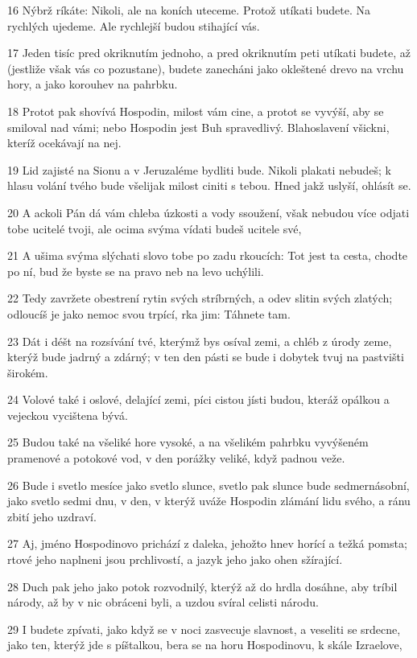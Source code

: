\par 16 Nýbrž ríkáte: Nikoli, ale na koních uteceme. Protož utíkati budete. Na rychlých ujedeme. Ale rychlejší budou stihající vás.
\par 17 Jeden tisíc pred okriknutím jednoho, a pred okriknutím peti utíkati budete, až (jestliže však vás co pozustane), budete zanecháni jako okleštené drevo na vrchu hory, a jako korouhev na pahrbku.
\par 18 Protot pak shovívá Hospodin, milost vám cine, a protot se vyvýší, aby se smiloval nad vámi; nebo Hospodin jest Buh spravedlivý. Blahoslavení všickni, kteríž ocekávají na nej.
\par 19 Lid zajisté na Sionu a v Jeruzaléme bydliti bude. Nikoli plakati nebudeš; k hlasu volání tvého bude všelijak milost ciniti s tebou. Hned jakž uslyší, ohlásít se.
\par 20 A ackoli Pán dá vám chleba úzkosti a vody ssoužení, však nebudou více odjati tobe ucitelé tvoji, ale ocima svýma vídati budeš ucitele své,
\par 21 A ušima svýma slýchati slovo tobe po zadu rkoucích: Tot jest ta cesta, chodte po ní, bud že byste se na pravo neb na levo uchýlili.
\par 22 Tedy zavržete obestrení rytin svých stríbrných, a odev slitin svých zlatých; odloucíš je jako nemoc svou trpící, rka jim: Táhnete tam.
\par 23 Dát i déšt na rozsívání tvé, kterýmž bys osíval zemi, a chléb z úrody zeme, kterýž bude jadrný a zdárný; v ten den pásti se bude i dobytek tvuj na pastvišti širokém.
\par 24 Volové také i oslové, delající zemi, píci cistou jísti budou, kteráž opálkou a vejeckou vycištena bývá.
\par 25 Budou také na všeliké hore vysoké, a na všelikém pahrbku vyvýšeném pramenové a potokové vod, v den porážky veliké, když padnou veže.
\par 26 Bude i svetlo mesíce jako svetlo slunce, svetlo pak slunce bude sedmernásobní, jako svetlo sedmi dnu, v den, v kterýž uváže Hospodin zlámání lidu svého, a ránu zbití jeho uzdraví.
\par 27 Aj, jméno Hospodinovo prichází z daleka, jehožto hnev horící a težká pomsta; rtové jeho naplneni jsou prchlivostí, a jazyk jeho jako ohen sžírající.
\par 28 Duch pak jeho jako potok rozvodnilý, kterýž až do hrdla dosáhne, aby tríbil národy, až by v nic obráceni byli, a uzdou svíral celisti národu.
\par 29 I budete zpívati, jako když se v noci zasvecuje slavnost, a veseliti se srdecne, jako ten, kterýž jde s píštalkou, bera se na horu Hospodinovu, k skále Izraelove,
